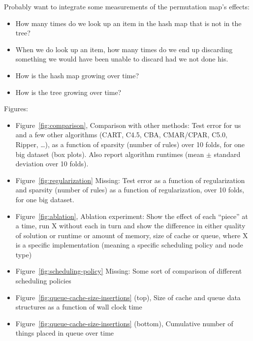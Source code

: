 Probably want to integrate some measurements of the permutation map's effects:
\begin{itemize}
\item How many times do we look up an item in the hash map that is not in the tree?

\item When we do look up an item, how many times do we end up discarding
      something we would have been unable to discard had we not done his.

\item How is the hash map growing over time?

\item How is the tree growing over time?
\end{itemize}

Figures:
\begin{itemize}

\item Figure~\ref{fig:comparison}, Comparison with other methods:
Test error for us and a few other algorithms
(CART, C4.5, CBA, CMAR/CPAR, C5.0, Ripper, \dots),
as a function of sparsity (number of rules) over 10 folds, for one big dataset (box plots).
Also report algorithm runtimes (mean $\pm$ standard deviation over 10 folds).

\item Figure~\ref{fig:regularization}
Missing:  Test error as a function of regularization and sparsity
(number of rules) as a function of regularization, over 10 folds,
for one big dataset.

\item Figure~\ref{fig:ablation},  Ablation experiment:
Show the effect of each ``piece'' at a time,
run X without each in turn and show the difference in either
quality of solution or runtime or amount of memory, size of cache or queue,
where X is a specific implementation
(meaning a specific scheduling policy and node type)

\item Figure~\ref{fig:scheduling-policy}
Missing:  Some sort of comparison of different scheduling policies

\item Figure~\ref{fig:queue-cache-size-insertions} (top),
Size of cache and queue data structures as a function of wall clock time

\item Figure~\ref{fig:queue-cache-size-insertions} (bottom),
Cumulative number of things placed in queue over time


\end{itemize}
